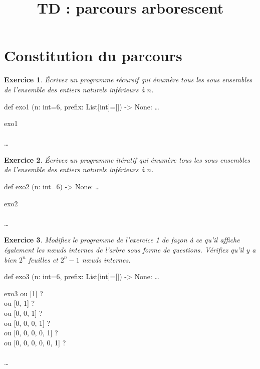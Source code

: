 \documentclass[11pt]{article}
\title{TD : parcours arborescent}
\author{}
\date{}
\newtheorem{exercice}{Exercice}
\newenvironment{signature}[1]{\begin{framed} \ttfamily def #1}{ \ldots \end{framed}}
\newenvironment{is_output}[1]{\begin{framed} \ttfamily python /\ldots /#1.py\\}{\end{framed}}
\begin{document}
\maketitle

\section{Constitution du parcours}

\begin{exercice}
{\'E}crivez un programme récursif qui énumère tous les sous ensembles de l'ensemble des entiers naturels inférieurs à $n$.
\end{exercice}

\begin{signature}{exo1}
(n: int=6, prefix: List[int]=[]) -> None:
\end{signature}

\begin{is_output}{exo1}
\quad [0, 0, 0, 0, 0, 0]\\
\quad [0, 0, 0, 0, 0, 1]\\
\quad [0, 0, 0, 0, 1, 0] \ldots
\end{is_output}

\begin{exercice}
{\'E}crivez un programme itératif qui énumère tous les sous ensembles de l'ensemble des entiers naturels inférieurs à $n$.
\end{exercice}

\begin{signature}{exo2}
(n: int=6) -> None:
\end{signature}

\begin{is_output}{exo2}
\quad [0, 0, 0, 0, 0, 0]\\
\quad [0, 0, 0, 0, 0, 1]\\
\quad [0, 0, 0, 0, 1, 0] \ldots
\end{is_output}

\begin{exercice}
Modifiez le programme de l'exercice 1 de façon à ce qu'il affiche également les n{\oe}uds internes de l'arbre sous forme de questions. Vérifiez qu'il y a bien $2^n$ feuilles et $2^n-1$ n{\oe}uds internes.
\end{exercice}

\begin{signature}{exo3}
(n: int=6, prefix: List[int]=[]) -> None:
\end{signature}

\begin{is_output}{exo3}
\quad [0] ou [1] ?\\
\quad [0, 0] ou [0, 1] ?\\
\quad [0, 0, 0] ou [0, 0, 1] ?\\
\quad [0, 0, 0, 0] ou [0, 0, 0, 1] ?\\
\quad [0, 0, 0, 0, 0] ou [0, 0, 0, 0, 1] ?\\
\quad [0, 0, 0, 0, 0, 0] ou [0, 0, 0, 0, 0, 1] ?\\
\quad [0, 0, 0, 0, 0, 0]\\
\quad [0, 0, 0, 0, 0, 1] \ldots
\end{is_output}
\end{document}
